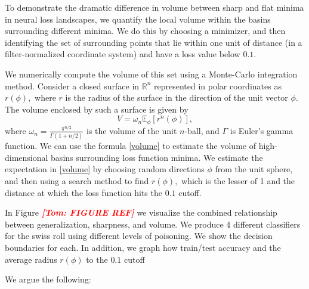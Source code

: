 \documentclass{article}
\newcommand{\tom}[1]{{  \textcolor{red}{\bf \em [Tom: #1]}}}
\begin{document}

To demonstrate the dramatic difference in volume between sharp and flat minima in neural loss landscapes, we quantify the local volume within the basins surrounding different minima.  We do this by choosing a minimizer, and then identifying the set of surrounding points that lie within one unit of distance (in a filter-normalized coordinate system) and have a loss value below $0.1.$

We numerically compute the volume of this set using a Monte-Carlo integration method.  Consider a closed surface in $\mathbb{R}^n$ represented in polar coordinates as $r(\phi),$ where $r$ is the radius of the surface in the direction of the unit vector $\phi$. The volume enclosed by such a surface is given by
\begin{equation}
V = \omega_n \mathbb{E}_\phi  [ r^n(\phi)], \label{volume}
\end{equation}
where $\omega_n = \frac{\pi^{n/2}}{\Gamma(1+n/2)}$ is the volume of the unit $n$-ball, and $\Gamma$ is Euler's gamma function.
We can use the formula \eqref{volume} to estimate the volume of high-dimensional basins surrounding loss function minima. We estimate the expectation in \eqref{volume} by choosing random directions $\phi$ from the unit sphere, and then using a search method to find $r(\phi),$ which is the lesser of 1 and the distance at which the loss function hits the $0.1$ cutoff.

In Figure \tom{FIGURE REF} we visualize the combined relationship between generalization, sharpness, and volume.  We produce 4 different classifiers for the swiss roll using different levels of poisoning.  We show the decision boundaries for each.  In addition, we graph how train/test accuracy and the average radius $r(\phi)$ to the $0.1$ cutoff





    We argue the following:
\end{document}
